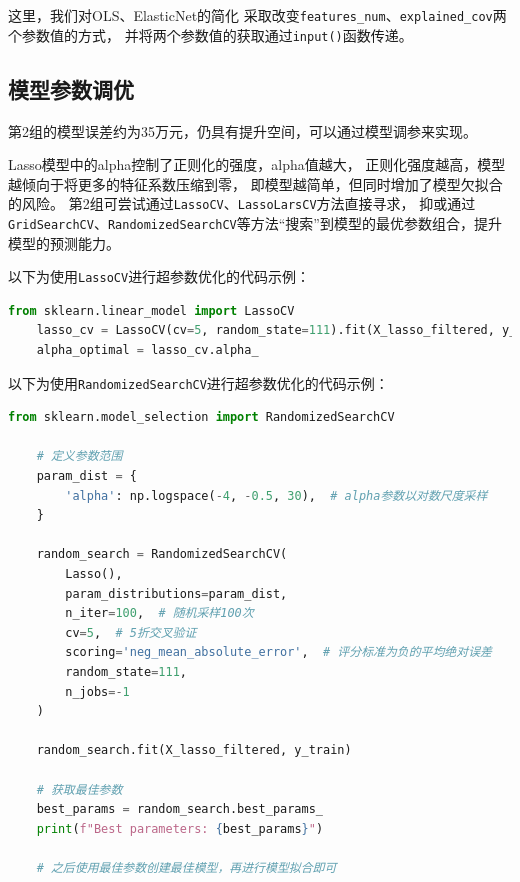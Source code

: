 \documentclass[
    report,     %
    oneside,    %
    UTF8,       %
    zihao=-4    %
]{config} %
\begin{document}
这里，我们对OLS、ElasticNet的简化
采取改变\lstinline|features_num|、\lstinline|explained_cov|两个参数值的方式，
并将两个参数值的获取通过\lstinline|input()|函数传递。

\subsection{模型参数调优}

第2组的模型误差约为35万元，仍具有提升空间，可以通过模型调参来实现。

Lasso模型中的alpha控制了正则化的强度，alpha值越大，
正则化强度越高，模型越倾向于将更多的特征系数压缩到零，
即模型越简单，但同时增加了模型欠拟合的风险。
第2组可尝试通过\lstinline|LassoCV|、\lstinline|LassoLarsCV|方法直接寻求，
抑或通过\lstinline|GridSearchCV|、\lstinline|RandomizedSearchCV|等方法“搜索”到模型的最优参数组合，提升模型的预测能力。

以下为使用\lstinline|LassoCV|进行超参数优化的代码示例：

\newpage

\begin{lstlisting}[label=code:lasso_cv, language=Python, caption=使用LassoCV进行超参数优化示例代码]
    from sklearn.linear_model import LassoCV
    lasso_cv = LassoCV(cv=5, random_state=111).fit(X_lasso_filtered, y_train)
    alpha_optimal = lasso_cv.alpha_
\end{lstlisting}

以下为使用\lstinline|RandomizedSearchCV|进行超参数优化的代码示例：

\begin{lstlisting}[label=code:randomized_search_cv, language=Python, caption=使用RandomizedSearchCV进行超参数优化示例代码]
    from sklearn.model_selection import RandomizedSearchCV

    # 定义参数范围
    param_dist = {
        'alpha': np.logspace(-4, -0.5, 30),  # alpha参数以对数尺度采样
    }
    
    random_search = RandomizedSearchCV(
        Lasso(),
        param_distributions=param_dist,
        n_iter=100,  # 随机采样100次
        cv=5,  # 5折交叉验证
        scoring='neg_mean_absolute_error',  # 评分标准为负的平均绝对误差
        random_state=111, 
        n_jobs=-1 
    )
    
    random_search.fit(X_lasso_filtered, y_train)
    
    # 获取最佳参数
    best_params = random_search.best_params_
    print(f"Best parameters: {best_params}")
    
    # 之后使用最佳参数创建最佳模型，再进行模型拟合即可
\end{lstlisting}
\end{document}
